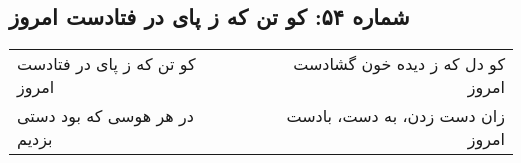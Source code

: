 \begin{center}
\section*{شماره ۵۴: کو تن که ز پای در فتادست امروز}
\label{sec:054}
\begin{longtable}{l p{0.5cm} r}
کو تن که ز پای در فتادست امروز
&&
کو دل که ز دیده خون گشادست امروز
\\
در هر هوسی که بود دستی بزدیم
&&
زان دست زدن، به دست، بادست امروز
\\
\end{longtable}
\end{center}
